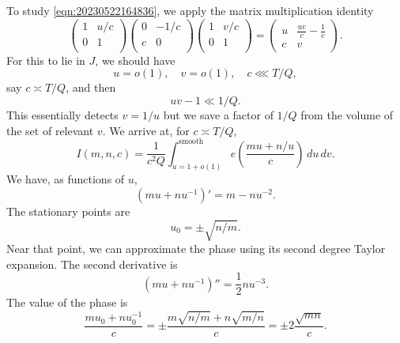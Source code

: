 \documentclass[reqno]{amsart} 
\begin{document}
To study \eqref{eqn:20230522164836}, we apply the matrix multiplication identity
\begin{equation*}
\begin{pmatrix}
1 & u/c \\
0 & 1 \\
\end{pmatrix}
\begin{pmatrix}
0 & -1/c \\
c & 0 \\
\end{pmatrix}
\begin{pmatrix}
1 & v/c \\
0 & 1 \\
\end{pmatrix}
=\begin{pmatrix}u & \frac{u v}{c} - \frac{1}{c}\\c & v\end{pmatrix}.
\end{equation*}
For this to lie in $J$, we should have
\begin{equation*}
u = o(1), \quad v = o(1), \quad c \lll T/Q,
\end{equation*}
say $c \asymp T / Q$, and then
\begin{equation*}
u v - 1 \ll 1/Q.
\end{equation*}
This essentially detects $v = 1 / u$ but we save a factor of $1/Q$ from the volume of the set of relevant $v$.  We arrive at, for $c \asymp T/Q$,
\begin{equation*}
  I(m,n,c)
  =
  \frac{1}{c^2 Q}
  \int_{u = 1  + o(1)}^{\text{smooth}}
  e \left( \frac{m u + n /u }{ c } \right) \, d u \, d v.
\end{equation*}
We have, as functions of $u$,
\begin{equation*}
(m u + n u^{-1} ) ' = m - n u^{-2}. 
\end{equation*}
The stationary points are
\begin{equation*}
  u_0 = \pm \sqrt{n/m}.
\end{equation*}
Near that point, we can approximate the phase using its second degree Taylor expansion.  The second derivative is
\begin{equation*}
(m u + n u^{-1} )'' = \frac{1}{2} n u^{-3}.
\end{equation*}
The value of the phase is
\begin{equation*}
  \frac{m u_0 + n u_0^{-1} }{c}
  =
  \pm \frac{m \sqrt{n / m } + n \sqrt{m / n} }{c}
  =
  \pm 2 \frac{\sqrt{m n }}{c}.
\end{equation*}
\end{document}
